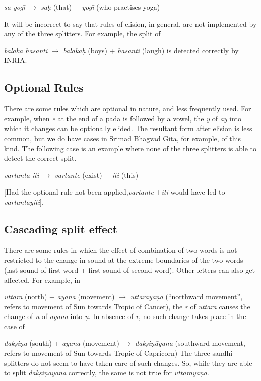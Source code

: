 \documentclass[11pt]{article}
\begin{document}
                        \textit{sa yog\={\i}} $\rightarrow$ \textit{sa\d{h}} (that) + \textit{yog\={\i}} (who practises yoga)
                        
It will be incorrect to say that rules of elision, in general, are not implemented by any of the three splitters. For example, the split of
 
            \textit{b\={a}lak\={a} hasanti} $\rightarrow$ \textit{b\={a}lak\={a}\d{h}} (boys) + \textit{hasanti} (laugh) is detected correctly by INRIA.                      

    
\subsection{Optional Rules}    
There are some rules which are optional in nature, and less frequently used. For example, when \textit{e} at the end of a pada is followed by a vowel, the \textit{y} of \textit{ay} into which it changes can be optionally elided. The resultant form after elision is less common, but we do have cases in Srimad Bhagvad Gita, for example, of this kind. The following case is an example where none of the three splitters is able to detect the correct split.
    
   \textit{ vartanta iti} $\rightarrow$ \textit{vartante} (exist) + \textit{iti} (this)
   
[Had the optional rule not been applied,\textit{vartante} +\textit{iti} would have led to \textit{vartantayiti}]. 

\subsection{Cascading split effect}
There are some rules in which the effect of combination of two words is not restricted to the change in sound at the extreme boundaries of the two words (last sound of first word + first sound of second word). Other letters can also get affected. For example, in 

       \textit{uttara} (north) + \textit{ayana} (movement) $\rightarrow$ \textit{uttar\={a}ya\d{n}a} (``northward movement'', refers to movement of Sun towards Tropic of Cancer), the \textit{r} of \textit{uttara} causes the change of \textit{n} of \textit{ayana} into \textit{ \d{n}}. In absence of \textit{r}, no such change takes place in the case of 


\textit{dak\d{s}i\d{n}a} (south) + \textit{ayana} (movement) $\rightarrow$ \textit{dak\d{s}i\d{n}\={a}yana} (southward movement, refers to movement of Sun towards Tropic of Capricorn) 
The three sandhi splitters do not seem to have taken care of such changes. So, while they are able to split \textit{dak\d{s}i\d{n}\={a}yana} correctly, the same is not true for \textit{uttar\={a}ya\d{n}a}.
\end{document}
